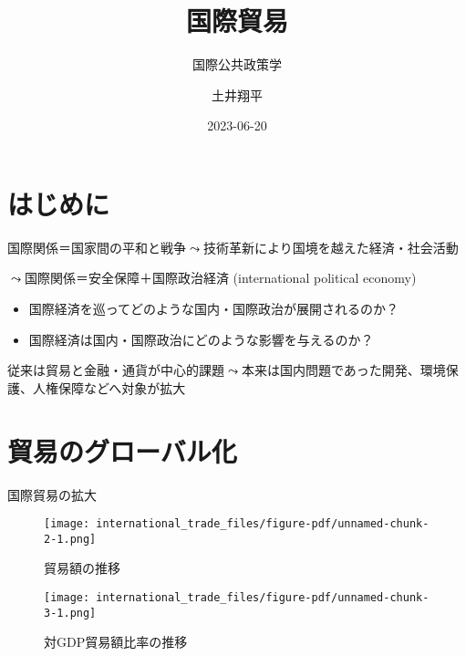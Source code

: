 \documentclass[
  xelatex,
  ja=standard]{bxjsarticle}
\title{国際貿易}
\subtitle{国際公共政策学}
\author{土井翔平}
\date{2023-06-20}
\providecommand{\tightlist}{%
  \setlength{\itemsep}{0pt}\setlength{\parskip}{0pt}}\usepackage{longtable,booktabs,array}
\begin{document}
\maketitle
\ifdefined\Shaded\renewenvironment{Shaded}{\begin{tcolorbox}[boxrule=0pt, borderline west={3pt}{0pt}{shadecolor}, sharp corners, breakable, frame hidden, interior hidden, enhanced]}{\end{tcolorbox}}\fi

\hypertarget{ux306fux3058ux3081ux306b}{%
\section*{はじめに}\label{ux306fux3058ux3081ux306b}}

国際関係＝国家間の平和と戦争\(\leadsto\)技術革新により国境を越えた経済・社会活動

\(\leadsto\)国際関係＝安全保障＋国際政治経済 (international political
economy)

\begin{itemize}
\tightlist
\item
  国際経済を巡ってどのような国内・国際政治が展開されるのか？
\item
  国際経済は国内・国際政治にどのような影響を与えるのか？
\end{itemize}

従来は貿易と金融・通貨が中心的課題\(\leadsto\)本来は国内問題であった開発、環境保護、人権保障などへ対象が拡大

\hypertarget{ux8cbfux6613ux306eux30b0ux30edux30fcux30d0ux30ebux5316}{%
\section{貿易のグローバル化}\label{ux8cbfux6613ux306eux30b0ux30edux30fcux30d0ux30ebux5316}}

国際貿易の拡大

\begin{figure}[htpb]

{\centering \texttt{[image: international\_trade\_files/figure-pdf/unnamed-chunk-2-1.png]}

}

\caption{貿易額の推移}

\end{figure}

\begin{figure}[htpb]

{\centering \texttt{[image: international\_trade\_files/figure-pdf/unnamed-chunk-3-1.png]}

}

\caption{対GDP貿易額比率の推移}

\end{figure}
\end{document}
